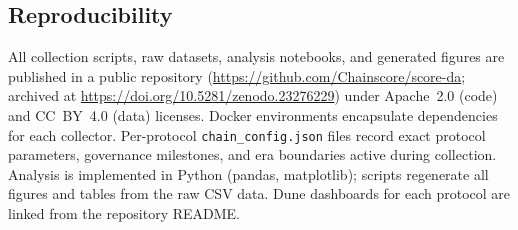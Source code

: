 \subsection{Reproducibility}
\label{sec:meth-reproducibility}

All collection scripts, raw datasets, analysis notebooks, and generated figures are published in a public repository (\url{https://github.com/Chainscore/score-da}; archived at \url{https://doi.org/10.5281/zenodo.23276229}) under Apache~2.0 (code) and CC~BY~4.0 (data) licenses.
Docker environments encapsulate dependencies for each collector.
Per-protocol \texttt{chain\_config.json} files record exact protocol parameters, governance milestones, and era boundaries active during collection.
Analysis is implemented in Python (pandas, matplotlib); scripts regenerate all figures and tables from the raw CSV data.
Dune dashboards for each protocol are linked from the repository README.
